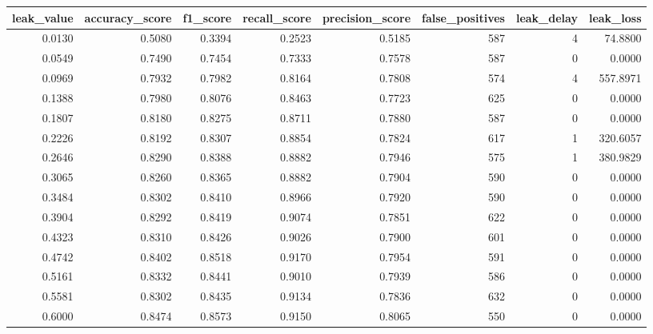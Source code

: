 \begin{tabular}{rrrrrrrr}
\toprule
leak\_value & accuracy\_score & f1\_score & recall\_score & precision\_score & false\_positives & leak\_delay & leak\_loss \\
\midrule
0.0130 & 0.5080 & 0.3394 & 0.2523 & 0.5185 & 587 & 4 & 74.8800 \\
0.0549 & 0.7490 & 0.7454 & 0.7333 & 0.7578 & 587 & 0 & 0.0000 \\
0.0969 & 0.7932 & 0.7982 & 0.8164 & 0.7808 & 574 & 4 & 557.8971 \\
0.1388 & 0.7980 & 0.8076 & 0.8463 & 0.7723 & 625 & 0 & 0.0000 \\
0.1807 & 0.8180 & 0.8275 & 0.8711 & 0.7880 & 587 & 0 & 0.0000 \\
0.2226 & 0.8192 & 0.8307 & 0.8854 & 0.7824 & 617 & 1 & 320.6057 \\
0.2646 & 0.8290 & 0.8388 & 0.8882 & 0.7946 & 575 & 1 & 380.9829 \\
0.3065 & 0.8260 & 0.8365 & 0.8882 & 0.7904 & 590 & 0 & 0.0000 \\
0.3484 & 0.8302 & 0.8410 & 0.8966 & 0.7920 & 590 & 0 & 0.0000 \\
0.3904 & 0.8292 & 0.8419 & 0.9074 & 0.7851 & 622 & 0 & 0.0000 \\
0.4323 & 0.8310 & 0.8426 & 0.9026 & 0.7900 & 601 & 0 & 0.0000 \\
0.4742 & 0.8402 & 0.8518 & 0.9170 & 0.7954 & 591 & 0 & 0.0000 \\
0.5161 & 0.8332 & 0.8441 & 0.9010 & 0.7939 & 586 & 0 & 0.0000 \\
0.5581 & 0.8302 & 0.8435 & 0.9134 & 0.7836 & 632 & 0 & 0.0000 \\
0.6000 & 0.8474 & 0.8573 & 0.9150 & 0.8065 & 550 & 0 & 0.0000 \\
\bottomrule
\end{tabular}
